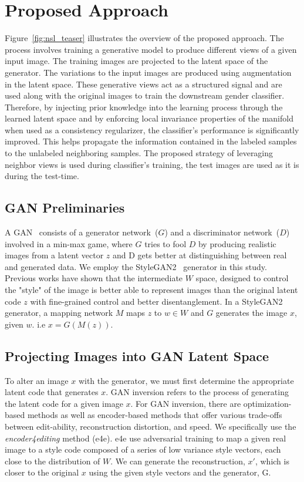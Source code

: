 \documentclass[runningheads]{llncs}
\begin{document}
\section{Proposed Approach}
Figure~\ref{fig:nsl_teaser} illustrates the overview of the proposed approach. The process involves training a generative model to produce different views of a given input image. The training images are projected to the latent space of the generator. The variations to the input images are produced using augmentation in the latent space. These generative views act as a structured signal and are used along with the original images to train the downstream gender classifier. Therefore, by injecting prior knowledge into the learning process through the learned latent space and by enforcing local invariance properties of the manifold when used as a consistency regularizer, the classifier's performance is significantly improved. This helps propagate the information contained in the labeled samples to the unlabeled neighboring samples. The proposed strategy of leveraging neighbor views is used during classifier's training, the test images are used as it is during the test-time. 

\subsection{GAN Preliminaries}
A GAN~\cite{gan} consists of a generator network~($G$) and a discriminator network~($D$) involved in a min-max game, where $G$ tries to fool $D$ by producing realistic images from a latent vector $z$ and D gets better at distinguishing between real and generated data. We employ the StyleGAN2~\cite{stylegan2} generator in this study. Previous works have shown that the intermediate $W$ space, designed to control the "style" of the image is better able to represent images than the original latent code $z$ with fine-grained control and better disentanglement. In a StyleGAN2 generator, a mapping network $M$ maps $z$ to $w \in W$ and $G$ generates the image $x$, given $w$. i.e $x = G(M(z))$.

\subsection{Projecting Images into GAN Latent Space}
To alter an image $x$ with the generator, we must first determine the appropriate latent code that generates $x$. GAN inversion refers to the process of generating the latent code for a given image $x$. For GAN inversion, there are optimization-based methods as well as encoder-based methods that offer various trade-offs between edit-ability, reconstruction distortion, and speed. We specifically use the \emph{encoder4editing} method (e4e)\cite{e4e}. e4e use adversarial training to map a given real image to a style code composed of a series of low variance style vectors, each close to the distribution of $W$. We can generate the reconstruction, $x'$, which is closer to the original $x$ using the given style vectors and the generator, G. 
\end{document}
